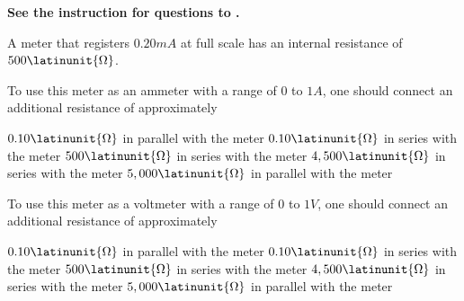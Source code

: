 \textbf{See the instruction for questions  to .}

A meter that registers $0.20 \unit{mA}$ at full scale has an internal resistance of $500 \latinunit{\Omega}$.

\begin{questions}\setcounter{question}{20}\question
To use this meter as an ammeter with a range of 0 to $1 \unit{A}$, one should connect an additional resistance of approximately

\begin{choices}
\choice $0.10  \latinunit{\Omega}$ in parallel with the meter
\choice $0.10  \latinunit{\Omega}$ in series with the meter
\choice $500   \latinunit{\Omega}$ in series with the meter
\choice $4,500 \latinunit{\Omega}$ in series with the meter
\choice $5,000 \latinunit{\Omega}$ in parallel with the meter
\end{choices}\end{questions}

\begin{questions}\setcounter{question}{21}\question
To use this meter as a voltmeter with a range of 0 to $1 \unit{V}$, one should connect an additional resistance of approximately

\begin{choices}
\choice $0.10  \latinunit{\Omega}$ in parallel with the meter
\choice $0.10  \latinunit{\Omega}$ in series with the meter
\choice $500   \latinunit{\Omega}$ in series with the meter
\choice $4,500 \latinunit{\Omega}$ in series with the meter
\choice $5,000 \latinunit{\Omega}$ in parallel with the meter
\end{choices}\end{questions}

